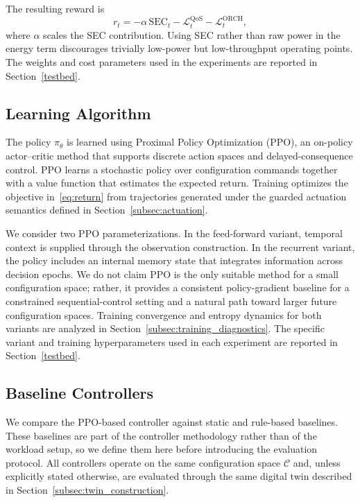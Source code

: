 \documentclass[a4paper,fleqn]{cas-sc}
\begin{document}
The resulting reward is
\begin{equation}
r_t=-\alpha\,\mathrm{SEC}_t-\mathcal{L}^{\mathrm{QoS}}_t-\mathcal{L}^{\mathrm{ORCH}}_t,
\label{eq:reward}
\end{equation}
where $\alpha$ scales the SEC contribution. Using SEC rather than raw power in the energy term discourages trivially low-power but low-throughput operating points. The weights and cost parameters used in the experiments are reported in Section~\ref{testbed}.

\subsection{Learning Algorithm}
\label{subsec:rl_algo}

The policy $\pi_\theta$ is learned using Proximal Policy Optimization (PPO), an on-policy actor--critic method that supports discrete action spaces and delayed-consequence control. PPO learns a stochastic policy over configuration commands together with a value function that estimates the expected return. Training optimizes the objective in~\eqref{eq:return} from trajectories generated under the guarded actuation semantics defined in Section~\ref{subsec:actuation}.

We consider two PPO parameterizations. In the feed-forward variant, temporal context is supplied through the observation construction. In the recurrent variant, the policy includes an internal memory state that integrates information across decision epochs. We do not claim PPO is the only suitable method for a small configuration space; rather, it provides a consistent policy-gradient baseline for a constrained sequential-control setting and a natural path toward larger future configuration spaces. Training convergence and entropy dynamics for both variants are analyzed in Section~\ref{subsec:training_diagnostics}. The specific variant and training hyperparameters used in each experiment are reported in Section~\ref{testbed}.



\subsection{Baseline Controllers}
\label{subsec:baselines}

We compare the PPO-based controller against static and rule-based baselines. These baselines are part of the controller methodology rather than of the workload setup, so we define them here before introducing the evaluation protocol. All controllers operate on the same configuration space $\mathcal{C}$ and, unless explicitly stated otherwise, are evaluated through the same digital twin described in Section~\ref{subsec:twin_construction}.
\end{document}
